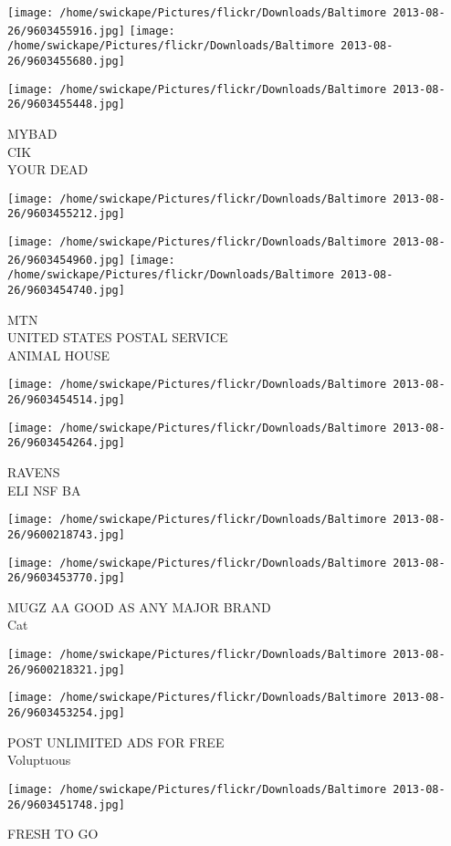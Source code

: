 \documentclass[10pt,letterpaper]{article}
\begin{document}
\texttt{[image: /home/swickape/Pictures/flickr/Downloads/Baltimore 2013-08-26/9603455916.jpg]}
\texttt{[image: /home/swickape/Pictures/flickr/Downloads/Baltimore 2013-08-26/9603455680.jpg]}

\texttt{[image: /home/swickape/Pictures/flickr/Downloads/Baltimore 2013-08-26/9603455448.jpg]}

MYBAD\\
CIK\\
YOUR DEAD\\
\pagebreak

\texttt{[image: /home/swickape/Pictures/flickr/Downloads/Baltimore 2013-08-26/9603455212.jpg]}

\vspace{0.25in}
\texttt{[image: /home/swickape/Pictures/flickr/Downloads/Baltimore 2013-08-26/9603454960.jpg]}
\texttt{[image: /home/swickape/Pictures/flickr/Downloads/Baltimore 2013-08-26/9603454740.jpg]}

MTN\\
UNITED STATES POSTAL SERVICE\\
ANIMAL HOUSE\\
\pagebreak

\texttt{[image: /home/swickape/Pictures/flickr/Downloads/Baltimore 2013-08-26/9603454514.jpg]}

\vspace{0.25in}
\texttt{[image: /home/swickape/Pictures/flickr/Downloads/Baltimore 2013-08-26/9603454264.jpg]}

RAVENS\\
ELI NSF BA\\
\pagebreak

\texttt{[image: /home/swickape/Pictures/flickr/Downloads/Baltimore 2013-08-26/9600218743.jpg]}

\vspace{0.25in}
\texttt{[image: /home/swickape/Pictures/flickr/Downloads/Baltimore 2013-08-26/9603453770.jpg]}

MUGZ AA GOOD AS ANY MAJOR BRAND\\
Cat\\
\pagebreak

\texttt{[image: /home/swickape/Pictures/flickr/Downloads/Baltimore 2013-08-26/9600218321.jpg]}

\vspace{0.25in}
\texttt{[image: /home/swickape/Pictures/flickr/Downloads/Baltimore 2013-08-26/9603453254.jpg]}

POST UNLIMITED ADS FOR FREE\\
Voluptuous\\
\pagebreak

\texttt{[image: /home/swickape/Pictures/flickr/Downloads/Baltimore 2013-08-26/9603451748.jpg]}

FRESH TO GO\\
\pagebreak
\end{document}
